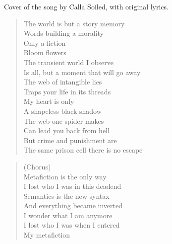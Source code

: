 

Cover of the song by Calla Soiled, with original lyrics.


\begin{minipage}{0.6\textwidth}
    \begin{verse}
    The world is but a story memory \\
	Words building a morality \\
	Only a fiction \\
	Bloom flowers \\
	The transient world I observe \\
	Is all, but a moment that will go away \\
	The web of intangible lies \\
	Traps your life in its threads \\
	My heart is only \\
	A shapeless black shadow \\
	The web one spider makes \\
	Can lead you back from hell \\
	But crime and punishment are \\
	The same prison cell there is no escape
    \end{verse}

    \begin{verse}
    (Chorus) \\
	Metafiction is the only way \\
	I lost who I was in this deadend \\
	Semantics is the new syntax \\
	And everything became inverted \\
	I wonder what I am anymore \\
	I lost who I was when I entered \\
	My metafiction
    \end{verse}

\end{minipage}
\clearpage

